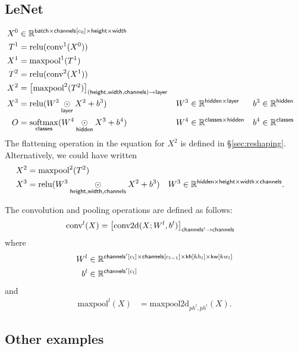 \documentclass{article}
\newcommand{\reals}{\mathbb{R}}
\begin{document}
\subsection{LeNet}

\begin{align*}
X^0 &\in \reals^{\name{batch} \times \nset{channels}{c_0} \times \name{height} \times \name{width}} \\
T^1 &= \text{relu}(\text{conv}^1(X^0)) \\
X^1 &= \text{maxpool}^1(T^1) \\
T^2 &= \text{relu}(\text{conv}^2(X^1)) \\
X^2 &= \nmov{(height,width,channels)}{layer}{\text{maxpool}^2(T^2)} \\
X^3 &= \text{relu}(W^3 \ndot{layer} X^2 + b^3) & W^3 &\in \mathbb{R}^{\name{hidden} \times \name{layer}} & b^3 &\in \mathbb{R}^{\name{hidden}} \\
O &= \nfun{classes}{softmax} (W^4 \ndot{hidden} X^3 + b^4) & W^4 &\in \mathbb{R}^{\name{classes} \times \name{hidden}} & b^4 &\in \mathbb{R}^{\name{classes}}
\end{align*}
The flattening operation in the equation for $X^2$ is defined in \S{\ref{sec:reshaping}}. Alternatively, we could have written
\begin{align*}
X^2 &= \text{maxpool}^2(T^2) \\
X^3 &= \text{relu}(W^3 \ndot{height,width,channels} X^2 + b^3) & W^3 &\in \mathbb{R}^{\name{hidden} \times \name{height} \times \name{width} \times \name{channels}}.
\end{align*}

The convolution and pooling operations are defined as follows:
\begin{align*}
\text{conv}^l(X) &= \nmov{channels'}{channels}{\text{conv2d}(X; W^l, b^l)}
\end{align*}
where
\begin{align*}
W^l & \in \reals^{\nset{channels'}{c_{l}} \times \nset{channels}{c_{l-1}} \times \nset{kh}{kh_l} \times \nset{kw}{kw_l}} \\
b^l &\in \reals^{\nset{channels'}{c_{l}}}
\end{align*}
and
\begin{align*}
\text{maxpool}^l(X) &= \text{maxpool2d}_{ph^l,ph^l}(X).
\end{align*}

\subsection{Other examples}
\end{document}
